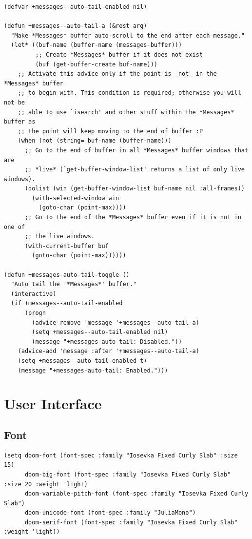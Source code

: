 \documentclass[11pt]{article}
\begin{document}
\begin{verbatim}
(defvar +messages--auto-tail-enabled nil)

(defun +messages--auto-tail-a (&rest arg)
  "Make *Messages* buffer auto-scroll to the end after each message."
  (let* ((buf-name (buffer-name (messages-buffer)))
         ;; Create *Messages* buffer if it does not exist
         (buf (get-buffer-create buf-name)))
    ;; Activate this advice only if the point is _not_ in the *Messages* buffer
    ;; to begin with. This condition is required; otherwise you will not be
    ;; able to use `isearch' and other stuff within the *Messages* buffer as
    ;; the point will keep moving to the end of buffer :P
    (when (not (string= buf-name (buffer-name)))
      ;; Go to the end of buffer in all *Messages* buffer windows that are
      ;; *live* (`get-buffer-window-list' returns a list of only live windows).
      (dolist (win (get-buffer-window-list buf-name nil :all-frames))
        (with-selected-window win
          (goto-char (point-max))))
      ;; Go to the end of the *Messages* buffer even if it is not in one of
      ;; the live windows.
      (with-current-buffer buf
        (goto-char (point-max))))))

(defun +messages-auto-tail-toggle ()
  "Auto tail the '*Messages*' buffer."
  (interactive)
  (if +messages--auto-tail-enabled
      (progn
        (advice-remove 'message '+messages--auto-tail-a)
        (setq +messages--auto-tail-enabled nil)
        (message "+messages-auto-tail: Disabled."))
    (advice-add 'message :after '+messages--auto-tail-a)
    (setq +messages--auto-tail-enabled t)
    (message "+messages-auto-tail: Enabled.")))
\end{verbatim}

\section{User Interface}
\label{sec:orge1aec25}
\subsection{Font}
\label{sec:org9edb52e}
\begin{verbatim}
(setq doom-font (font-spec :family "Iosevka Fixed Curly Slab" :size 15)
      doom-big-font (font-spec :family "Iosevka Fixed Curly Slab" :size 20 :weight 'light)
      doom-variable-pitch-font (font-spec :family "Iosevka Fixed Curly Slab")
      doom-unicode-font (font-spec :family "JuliaMono")
      doom-serif-font (font-spec :family "Iosevka Fixed Curly Slab" :weight 'light))
\end{verbatim}
\end{document}
